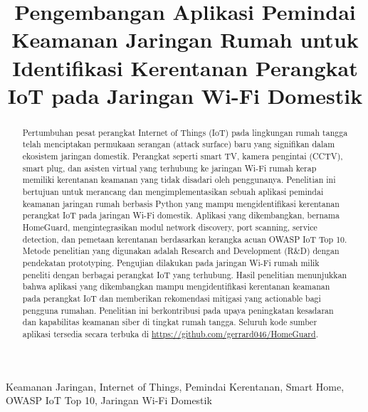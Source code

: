 \documentclass[conference]{IEEEtran}
\begin{document}
\title{Pengembangan Aplikasi Pemindai Keamanan Jaringan Rumah untuk
Identifikasi Kerentanan Perangkat IoT pada Jaringan Wi-Fi Domestik}

\author{
}

\maketitle

\begin{abstract}
Pertumbuhan pesat perangkat Internet of Things (IoT) pada lingkungan rumah
tangga telah menciptakan permukaan serangan (attack surface) baru yang
signifikan dalam ekosistem jaringan domestik. Perangkat seperti smart TV,
kamera pengintai (CCTV), smart plug, dan asisten virtual yang terhubung ke
jaringan Wi-Fi rumah kerap memiliki kerentanan keamanan yang tidak disadari
oleh penggunanya. Penelitian ini bertujuan untuk merancang dan
mengimplementasikan sebuah aplikasi pemindai keamanan jaringan rumah berbasis
Python yang mampu mengidentifikasi kerentanan perangkat IoT pada jaringan
Wi-Fi domestik. Aplikasi yang dikembangkan, bernama HomeGuard, mengintegrasikan
modul network discovery, port scanning, service detection, dan pemetaan
kerentanan berdasarkan kerangka acuan OWASP IoT Top 10. Metode penelitian yang
digunakan adalah Research and Development (R\&D) dengan pendekatan prototyping.
Pengujian dilakukan pada jaringan Wi-Fi rumah milik peneliti dengan berbagai
perangkat IoT yang terhubung. Hasil penelitian menunjukkan bahwa aplikasi yang
dikembangkan mampu mengidentifikasi kerentanan keamanan pada perangkat IoT dan
memberikan rekomendasi mitigasi yang actionable bagi pengguna rumahan.
Penelitian ini berkontribusi pada upaya peningkatan kesadaran dan kapabilitas
keamanan siber di tingkat rumah tangga. Seluruh kode sumber aplikasi tersedia
secara terbuka di \url{https://github.com/gerrard046/HomeGuard}.
\end{abstract}

\begin{IEEEkeywords}
Keamanan Jaringan, Internet of Things, Pemindai Kerentanan, Smart Home,
OWASP IoT Top 10, Jaringan Wi-Fi Domestik
\end{IEEEkeywords}
\end{document}
